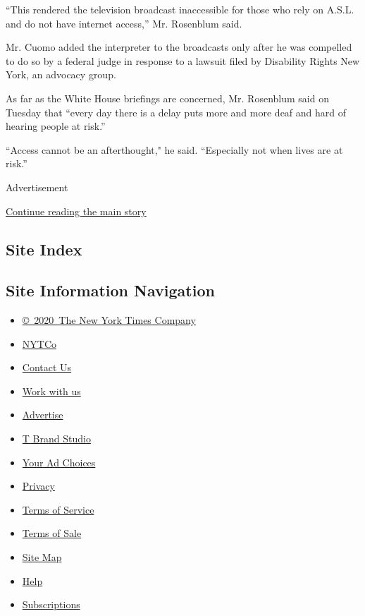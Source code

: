 ``This rendered the television broadcast inaccessible for those who rely
on A.S.L. and do not have internet access,'' Mr. Rosenblum said.

Mr. Cuomo added the interpreter to the broadcasts only after he was
compelled to do so by a federal judge in response to a lawsuit filed by
Disability Rights New York, an advocacy group.

As far as the White House briefings are concerned, Mr. Rosenblum said on
Tuesday that ``every day there is a delay puts more and more deaf and
hard of hearing people at risk.''

``Access cannot be an afterthought," he said. ``Especially not when
lives are at risk.''

Advertisement

\protect\hyperlink{after-bottom}{Continue reading the main story}

\hypertarget{site-index}{%
\subsection{Site Index}\label{site-index}}

\hypertarget{site-information-navigation}{%
\subsection{Site Information
Navigation}\label{site-information-navigation}}

\begin{itemize}
\tightlist
\item
  \href{https://help.nytimes.com/hc/en-us/articles/115014792127-Copyright-notice}{©~2020~The
  New York Times Company}
\end{itemize}

\begin{itemize}
\tightlist
\item
  \href{https://www.nytco.com/}{NYTCo}
\item
  \href{https://help.nytimes.com/hc/en-us/articles/115015385887-Contact-Us}{Contact
  Us}
\item
  \href{https://www.nytco.com/careers/}{Work with us}
\item
  \href{https://nytmediakit.com/}{Advertise}
\item
  \href{http://www.tbrandstudio.com/}{T Brand Studio}
\item
  \href{https://www.nytimes.com/privacy/cookie-policy\#how-do-i-manage-trackers}{Your
  Ad Choices}
\item
  \href{https://www.nytimes.com/privacy}{Privacy}
\item
  \href{https://help.nytimes.com/hc/en-us/articles/115014893428-Terms-of-service}{Terms
  of Service}
\item
  \href{https://help.nytimes.com/hc/en-us/articles/115014893968-Terms-of-sale}{Terms
  of Sale}
\item
  \href{https://spiderbites.nytimes.com}{Site Map}
\item
  \href{https://help.nytimes.com/hc/en-us}{Help}
\item
  \href{https://www.nytimes.com/subscription?campaignId=37WXW}{Subscriptions}
\end{itemize}
